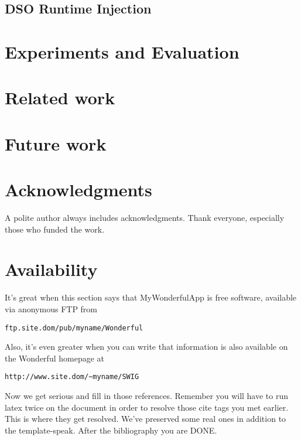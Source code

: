 \documentclass[letterpaper,twocolumn,10pt]{article}
\begin{document}
\subsection{DSO Runtime Injection} \label{sec:dso}

\section{Experiments and Evaluation}

\section{Related work}

\section{Future work}

\section{Acknowledgments}

A polite author always includes acknowledgments.  Thank everyone,
especially those who funded the work. 

\section{Availability}

It's great when this section says that MyWonderfulApp is free software, 
available via anonymous FTP from

\begin{center}
{\tt ftp.site.dom/pub/myname/Wonderful}\\
\end{center}

Also, it's even greater when you can write that information is also 
available on the Wonderful homepage at 

\begin{center}
{\tt http://www.site.dom/\~{}myname/SWIG}
\end{center}

Now we get serious and fill in those references.  Remember you will
have to run latex twice on the document in order to resolve those
cite tags you met earlier.  This is where they get resolved.
We've preserved some real ones in addition to the template-speak.
After the bibliography you are DONE.

{\footnotesize 
}
\end{document}
